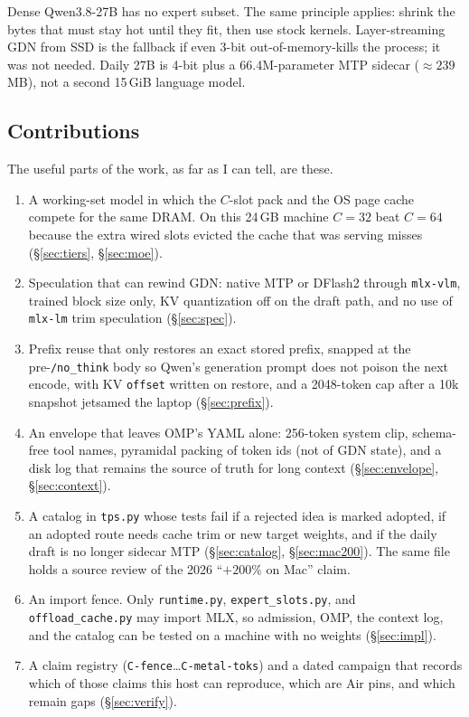 Dense Qwen3.8-27B has no expert subset. The same principle applies: shrink the bytes that must stay hot until they fit, then use stock kernels. Layer-streaming GDN from SSD is the fallback if even 3-bit out-of-memory-kills the process; it was not needed. Daily 27B is 4-bit plus a 66.4M-parameter MTP sidecar ($\approx 239$\,MB), not a second 15\,GiB language model.

\subsection{Contributions}

The useful parts of the work, as far as I can tell, are these.

\begin{enumerate}[leftmargin=1.4em,itemsep=0.35em]
\item A working-set model in which the $C$-slot pack and the OS page cache compete for the same DRAM. On this 24\,GB machine $C{=}32$ beat $C{=}64$ because the extra wired slots evicted the cache that was serving misses (\S\ref{sec:tiers}, \S\ref{sec:moe}).
\item Speculation that can rewind GDN: native MTP or DFlash2 through \texttt{mlx-vlm}, trained block size only, KV quantization off on the draft path, and no use of \texttt{mlx-lm} trim speculation (\S\ref{sec:spec}).
\item Prefix reuse that only restores an exact stored prefix, snapped at the pre-\texttt{/no\_think} body so Qwen's generation prompt does not poison the next encode, with KV \texttt{offset} written on restore, and a 2048-token cap after a 10k snapshot jetsamed the laptop (\S\ref{sec:prefix}).
\item An envelope that leaves OMP's YAML alone: 256-token system clip, schema-free tool names, pyramidal packing of token ids (not of GDN state), and a disk log that remains the source of truth for long context (\S\ref{sec:envelope}, \S\ref{sec:context}).
\item A catalog in \texttt{tps.py} whose tests fail if a rejected idea is marked adopted, if an adopted route needs cache trim or new target weights, and if the daily draft is no longer sidecar MTP (\S\ref{sec:catalog}, \S\ref{sec:mac200}). The same file holds a source review of the 2026 ``${+}200\%$ on Mac'' claim.
\item An import fence. Only \texttt{runtime.py}, \texttt{expert\_slots.py}, and \texttt{offload\_cache.py} may import MLX, so admission, OMP, the context log, and the catalog can be tested on a machine with no weights (\S\ref{sec:impl}).
\item A claim registry (\texttt{C-fence}{\ldots}\texttt{C-metal-toks}) and a dated campaign that records which of those claims this host can reproduce, which are Air pins, and which remain gaps (\S\ref{sec:verify}).
\end{enumerate}

